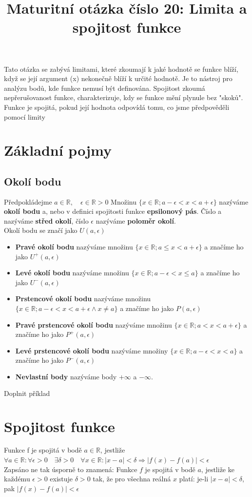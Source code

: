 \documentclass[12pt]{article}
\title{Maturitní otázka číslo 20: Limita a spojitost funkce}
\author{}
\date{}
\begin{document}
\maketitle
Tato otázka se zabývá limitami, které zkoumají k jaké hodnotě se funkce blíží, když se její argument (x) nekonečně blíží k určité hodnotě. Je to nástroj pro analýzu bodů, kde funkce nemusí být definována. Spojitost zkoumá nepřerušovanost funkce, charakterizuje, kdy se funkce mění plynule bez "skoků". Funkce je spojitá, pokud její hodnota odpovídá tomu, co jsme předpověděli pomocí limity
\section*{Základní pojmy}
\subsection*{Okolí bodu}
Předpokládejme $a \in \mathbb{R}, \quad \epsilon \in \mathbb{R}>0$ 
Množinu $\{x\in\mathbb{R}; a-\epsilon<x<a+\epsilon\}$ nazýváme \textbf{okolí bodu} a, nebo v definici spojitosti funkce \textbf{epsilonový pás}. Číslo a nazýváme \textbf{střed okolí}, číslo $\epsilon$ nazýváme \textbf{poloměr okolí}.\\
Okolí bodu se značí jako $U(a,\epsilon)$
\begin{itemize}[itemsep = 2pt]
    \item \textbf{Pravé okolí bodu} nazýváme množinu $\{x\in \mathbb{R};a\leq x < a+\epsilon\}$ a značíme ho jako $U^+(a,\epsilon)$
    \item \textbf{Levé okolí bodu} nazýváme množinu $\{x \in \mathbb{R};a-\epsilon < x \leq a\}$ a značíme ho jako $U^-(a,\epsilon)$
    \item \textbf{Prstencové okolí bodu} nazýváme množinu $\{x\in \mathbb{R}; a-\epsilon < x < a+\epsilon \land x \neq a\}$ a značíme ho jako $P(a,\epsilon)$
    \item \textbf{Pravé prstencové okolí bodu} nazýváme množinu $\{x \in \mathbb{R};a<x<a+\epsilon\}$ a značíme ho jako $P^+(a,\epsilon)$
    \item \textbf{Levé prstencové okolí bodu} nazýváme množiny $\{x\in \mathbb{R}; a-\epsilon < x<a\}$ a značíme ho jako $P^-(a,\epsilon)$
    \item \textbf{Nevlastní body} nazýváme body $+\infty$ a $-\infty$.
\end{itemize}

Doplnit příklad

\section*{Spojitost funkce}
Funkce f je spojitá v bodě $a \in \mathbb{R}$, jestliže\\
$\forall a \in \mathbb{R} : \forall \epsilon > 0 \quad  \exists \delta > 0 \quad \forall x \in \mathbb{R} : |x-a| < \delta \Rightarrow |f(x) - f(a)| <  \epsilon$ \\
Zapsáno ne tak úsporně to znamená: Funkce $f$ je spojitá v bodě $a$, jestliže ke každému $\epsilon > 0$ existuje $\delta > 0$ tak, že pro všechna reálná $x$ platí: je-li $|x-a| < \delta$, pak $|f(x)-f(a)| < \epsilon$
\end{document}
